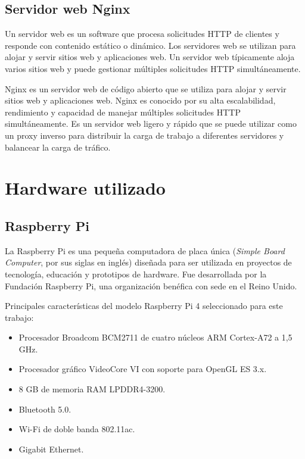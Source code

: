 \subsection{Servidor web Nginx}
\label{subsec:servidorweb}

Un servidor web es un software que procesa solicitudes HTTP de clientes y responde con contenido estático o dinámico. Los servidores web se utilizan para alojar y servir sitios web y aplicaciones web. Un servidor web típicamente aloja varios sitios web y puede gestionar múltiples solicitudes HTTP simultáneamente.

Nginx \cite{WEBSITE:NGINX} es un servidor web de código abierto que se utiliza para alojar y servir sitios web y aplicaciones web. Nginx es conocido por su alta escalabilidad, rendimiento y capacidad de manejar múltiples solicitudes HTTP simultáneamente. Es un servidor web ligero y rápido que se puede utilizar como un proxy inverso para distribuir la carga de trabajo a diferentes servidores y balancear la carga de tráfico.

\section{Hardware utilizado}
\label{sec:hardware}

\subsection{Raspberry Pi}
\label{subsec:rbpi}

La Raspberry Pi \cite{WEBSITE:raspberrypi} es una pequeña computadora de placa única (\textit{Simple Board Computer}, por sus siglas en inglés) diseñada para ser utilizada en proyectos de tecnología, educación y prototipos de hardware. Fue desarrollada por la Fundación Raspberry Pi, una organización benéfica con sede en el Reino Unido.

Principales características del modelo Raspberry Pi 4 seleccionado para este trabajo:

\begin{itemize}
\item Procesador Broadcom BCM2711 de cuatro núcleos ARM Cortex-A72 a 1,5 GHz.
\item Procesador gráfico VideoCore VI con soporte para OpenGL ES 3.x. 
\item 8 GB de memoria RAM LPDDR4-3200.
\item Bluetooth 5.0.
\item Wi-Fi de doble banda 802.11ac.
\item Gigabit Ethernet.
\end{itemize}

